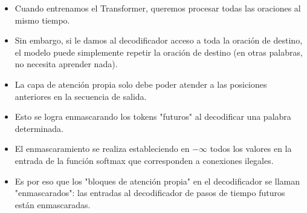 \begin{itemize}
\item Cuando entrenamos el Transformer, queremos procesar todas las oraciones al mismo tiempo.

\item Sin embargo, si le damos al decodificador acceso a toda la oración de destino, el modelo puede simplemente repetir la oración de destino (en otras palabras, no necesita aprender nada).

\item La capa de atención propia solo debe poder atender a las posiciones anteriores en la secuencia de salida.

\item Esto se logra enmascarando los tokens "futuros" al decodificar una palabra determinada.

\item El enmascaramiento se realiza estableciendo en $- \infty$ todos los valores en la entrada de la función softmax que corresponden a conexiones ilegales.
\item Es por eso que los "bloques de atención propia" en el decodificador se llaman "enmascarados": las entradas al decodificador de pasos de tiempo futuros están enmascaradas.

\end{itemize}

